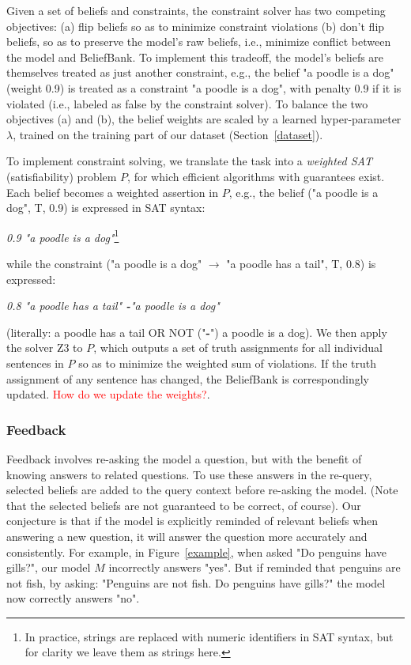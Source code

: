 \documentclass[11pt]{article}
\newcommand{\red}[1]{\textcolor{red}{#1}}
\newenvironment{myquote2}{                   %
  \parskip 1mm \begin{quoting}[vskip=0mm,leftmargin=4mm]}{
\end{quoting}}
\begin{document}
Given a set of beliefs and constraints, the constraint solver has two competing objectives: (a) flip 
beliefs so as to minimize constraint violations (b) don't flip beliefs, so as to preserve
the model's raw beliefs, i.e., minimize conflict between the model and BeliefBank. 
To implement this tradeoff, the model's beliefs are themselves treated as just
another constraint, e.g., the belief "a poodle is a dog" (weight 0.9) is treated as a constraint
"a poodle is a dog", with penalty 0.9 if it is violated (i.e., labeled as false by the constraint solver).
To balance the two objectives (a) and (b), the belief weights are scaled by a learned hyper-parameter $\lambda$,
trained on the training part of our dataset (Section~\ref{dataset}).

To implement constraint solving, we translate the task into a {\it weighted SAT} (satisfiability) problem $P$,
for which efficient algorithms with guarantees exist. Each belief becomes a weighted assertion in $P$, e.g.,
the belief ("a poodle is a dog", T, 0.9) is expressed in SAT syntax:
\begin{myquote2}
{\it 0.9 "a poodle is a dog"}\footnote{In practice, strings are replaced with numeric identifiers in SAT syntax, but for clarity we leave them as strings here.}
\end{myquote2}
while the constraint ("a poodle is a dog" $\rightarrow$ "a poodle has a tail", T, 0.8) is expressed:
\begin{myquote2}
{\it 0.8 "a poodle has a tail"  {\bf -}"a poodle is a dog"}
\end{myquote2}
(literally: a poodle has a tail OR NOT ("{\bf -}") a poodle is a dog). 
We then apply the solver Z3 \cite{??} to $P$, which outputs a set of truth assignments for all individual 
sentences in $P$ so as to minimize the weighted sum of violations. If the truth assignment of any sentence
has changed, the BeliefBank is correspondingly updated. \red{How do we update the weights?}.


\subsubsection{Feedback}

Feedback involves re-asking the model a question, but with the benefit
of knowing answers to related questions. To use these answers in the re-query,
selected beliefs are added to the query context before re-asking the model.
(Note that the selected beliefs are not guaranteed to be correct, of course).
Our conjecture is that if the model is explicitly reminded of relevant beliefs when answering a new question,
it will answer the question more accurately and consistently.
For example, in Figure~\ref{example}, when asked "Do penguins have gills?", our model $M$ incorrectly answers "yes".
But if reminded that penguins are not fish, by asking: "Penguins are not fish. Do penguins have gills?" 
the model now correctly answers "no". 
\end{document}
